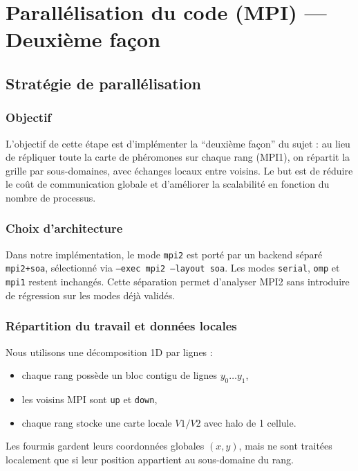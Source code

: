 \section{Parallélisation du code (MPI) --- Deuxième façon}

\subsection{Stratégie de parallélisation}

\subsubsection{Objectif}

L'objectif de cette étape est d'implémenter la ``deuxième façon'' du sujet :
au lieu de répliquer toute la carte de phéromones sur chaque rang (MPI1), on
répartit la grille par sous-domaines, avec échanges locaux entre voisins.
Le but est de réduire le coût de communication globale et d'améliorer la
scalabilité en fonction du nombre de processus.

\subsubsection{Choix d'architecture}

Dans notre implémentation, le mode \texttt{mpi2} est porté par un backend séparé
\texttt{mpi2+soa}, sélectionné via \texttt{--exec mpi2 --layout soa}.
Les modes \texttt{serial}, \texttt{omp} et \texttt{mpi1} restent inchangés.
Cette séparation permet d'analyser MPI2 sans introduire de régression sur les
modes déjà validés.

\subsubsection{Répartition du travail et données locales}

Nous utilisons une décomposition 1D par lignes :
\begin{itemize}[leftmargin=*]
  \item chaque rang possède un bloc contigu de lignes \(y_0 \dots y_1\),
  \item les voisins MPI sont \texttt{up} et \texttt{down},
  \item chaque rang stocke une carte locale \(V1/V2\) avec halo de 1 cellule.
\end{itemize}

Les fourmis gardent leurs coordonnées globales \((x,y)\), mais ne sont
traitées localement que si leur position appartient au sous-domaine du rang.


